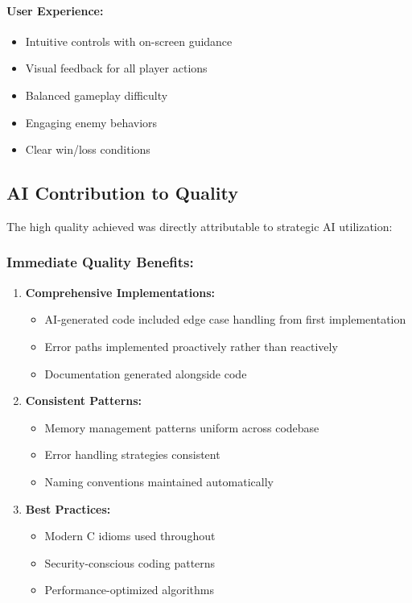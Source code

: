 \documentclass[12pt,a4paper]{article}
\begin{document}
\paragraph{User Experience:}
\begin{itemize}
    \item Intuitive controls with on-screen guidance
    \item Visual feedback for all player actions
    \item Balanced gameplay difficulty
    \item Engaging enemy behaviors
    \item Clear win/loss conditions
\end{itemize}

\subsection{AI Contribution to Quality}

The high quality achieved was directly attributable to strategic AI utilization:

\subsubsection*{Immediate Quality Benefits:}

\begin{enumerate}
    \item \textbf{Comprehensive Implementations:}
    \begin{itemize}
        \item AI-generated code included edge case handling from first implementation
        \item Error paths implemented proactively rather than reactively
        \item Documentation generated alongside code
    \end{itemize}
    
    \item \textbf{Consistent Patterns:}
    \begin{itemize}
        \item Memory management patterns uniform across codebase
        \item Error handling strategies consistent
        \item Naming conventions maintained automatically
    \end{itemize}
    
    \item \textbf{Best Practices:}
    \begin{itemize}
        \item Modern C idioms used throughout
        \item Security-conscious coding patterns
        \item Performance-optimized algorithms
    \end{itemize}
\end{enumerate}
\end{document}
